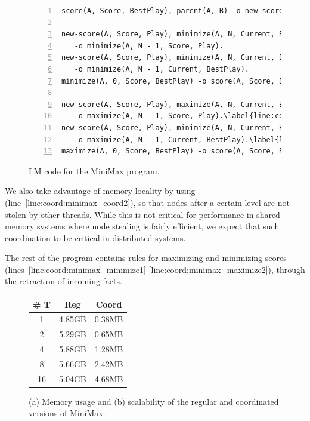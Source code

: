 \begin{figure}[ht]
\begin{Verbatim}[numbers=left,commandchars=\\\{\},fontsize=\codesize]
score(A, Score, BestPlay), parent(A, B) -o new-score(B, Score, BestPlay).\label{line:coord:minimax_new}

new-score(A, Score, Play), minimize(A, N, Current, BestPlay), Current > Score\label{line:coord:minimax_minimize1}
   -o minimize(A, N - 1, Score, Play).
new-score(A, Score, Play), minimize(A, N, Current, BestPlay), Current <= Score
   -o minimize(A, N - 1, Current, BestPlay).
minimize(A, 0, Score, BestPlay) -o score(A, Score, BestPlay).\label{line:coord:minimax_minimize2}

new-score(A, Score, Play), maximize(A, N, Current, BestPlay), Current < Score\label{line:coord:minimax_maximize1}\label{line:coord:minimax_maximize_rule11}
   -o maximize(A, N - 1, Score, Play).\label{line:coord:minimax_maximize_rule12}
new-score(A, Score, Play), minimize(A, N, Current, BestPlay), Current >= Score\label{line:coord:minimax_maximize_rule21}
   -o maximize(A, N - 1, Current, BestPlay).\label{line:coord:minimax_maximize_rule22}
maximize(A, 0, Score, BestPlay) -o score(A, Score, BestPlay).\label{line:coord:minimax_maximize2}
\end{Verbatim}
\caption{LM code for the MiniMax program.}
\label{code:coord:minimax}
\end{figure}

We also take advantage of memory locality by using 
(line~\ref{line:coord:minimax_coord2}), so that nodes after a certain level are
   not stolen by other threads. While this is not critical for performance in
   shared memory systems where node stealing is fairly efficient, we expect that
   such coordination to be critical in distributed systems.

The rest of the program contains rules for maximizing and minimizing scores
(lines~\ref{line:coord:minimax_minimize1}-\ref{line:coord:minimax_maximize2}),
through the retraction of  incoming facts.

\begin{figure}[ht]
   \begin{center}
      \begin{tabular}[b]{ | c | c | c |}
         \hline
         \textbf{\# T} & \textbf{Reg} & \textbf{Coord} \\ \hline \hline
         1 & 4.85GB & 0.38MB \\ \hline
         2 & 5.29GB & 0.65MB \\ \hline
         4 & 5.88GB & 1.28MB \\ \hline
         8 & 5.66GB & 2.42MB \\ \hline
         16 & 5.04GB & 4.68MB \\ \hline
         \end{tabular}
   \end{center}

   \caption{(a) Memory usage and (b) scalability of the regular and coordinated
versions of MiniMax.}
   \label{results:memory_minmax}
\end{figure}

